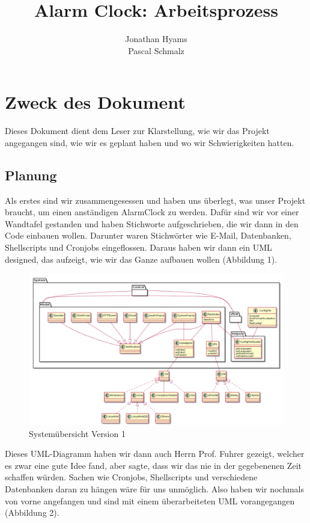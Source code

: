 \documentclass[11pt,titelpage]{scrartcl}
\title{Alarm Clock: Arbeitsprozess }
\author{Jonathan Hyams \\Pascal Schmalz}
\begin{document}
\thispagestyle{empty}
\maketitle
\pagebreak
\tableofcontents

\pagestyle{fancy}


\begin{abstract}
\end{abstract}
\pagebreak


\section{Zweck des Dokument}
Dieses Dokument dient dem Leser zur Klarstellung, wie wir das Projekt angegangen sind, wie wir es geplant haben und wo wir Schwierigkeiten hatten.
\subsection{Planung}
Als erstes sind wir zusammengesessen und haben uns überlegt, was unser Projekt braucht, um einen anständigen AlarmClock zu werden. Dafür sind wir
vor einer Wandtafel gestanden und haben Stichworte aufgeschrieben, die wir dann in den Code einbauen wollen. Darunter waren Stichwörter wie
E-Mail, Datenbanken, Shellscripts und Cronjobs eingeflossen. Daraus haben wir dann ein UML designed, das aufzeigt, wie wir das Ganze aufbauen wollen (Abbildung 1).
\begin{landscape}
\begin{figure}
  \centering
    \includegraphics[width=1\textwidth]{../uml/uebersicht00.png}
  \caption{Systemübersicht Version 1}
  \label{fig:overview}
\end{figure}
\end{landscape}
Dieses UML-Diagramm haben wir dann auch Herrn Prof. Fuhrer gezeigt, welcher es zwar eine gute Idee fand, aber sagte, dass wir das nie in der gegebenenen
Zeit schaffen würden. Sachen wie Cronjobs, Shellscripts und verschiedene Datenbanken daran zu hängen wäre für uns unmöglich.
Also haben wir nochmals von vorne angefangen und sind mit einem überarbeiteten UML vorangegangen (Abbildung 2).
\end{document}
